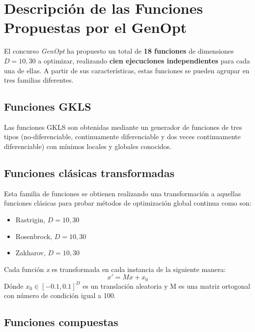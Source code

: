 \section{Descripción de las Funciones Propuestas por el GenOpt}
\label{sec:GENOPT}

El concurso \textit{GenOpt} ha propuesto un total de \textbf{18 funciones} de dimensiones $D = 10, 30$ a optimizar, realizando \textbf{cien ejecuciones independientes} para cada una de ellas. A partir de sus características, estas funciones se pueden agrupar en tres familias diferentes.

\bigskip
\subsection{Funciones GKLS}\label{sec:GKLS}
Las funciones GKLS \cite{GKLS} son obtenidas mediante un generador de funciones de tres tipos (no-diferenciable, continuamente diferenciable y dos veces continuamente diferenciable) con mínimos locales y globales conocidos.
 
\subsection{Funciones clásicas transformadas}

Esta familia de funciones se obtienen realizando una transformación a aquellas funciones clásicas para probar métodos de optimización global continua como son:
    \begin{itemize}
    	\item Rastrigin, $D = 10, 30$ 
    	\item Rosenbrock, $D = 10, 30$ 
    	\item Zakharov, $D = 10, 30$ 
    \end{itemize}
    Cada función \textit{x} es transformada en cada instancia de la siguiente manera: 
    \begin{equation}
    x' = Mx + x_{0}
    \end{equation}
    Dónde $x_{0}\in[-0.1, 0.1]^{D}$ es un translación aleatoria y M es una matriz ortogonal con número de condición igual a 100.

\subsection{Funciones compuestas} 

